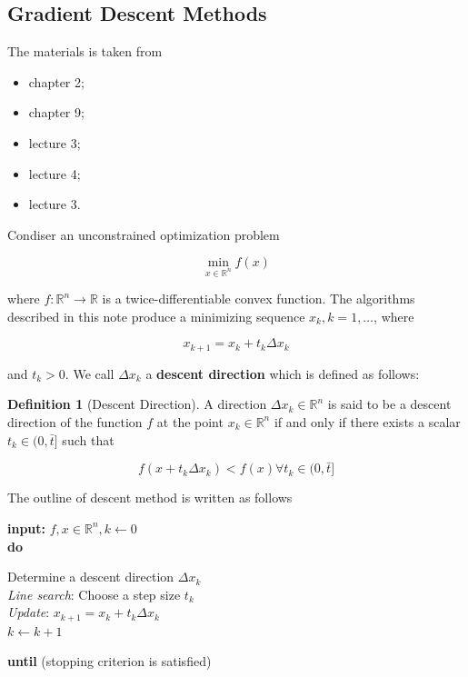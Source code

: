 \documentclass[12pt]{article} %
\theoremstyle{definition}
\newtheorem{definition}{Definition}
\newcommand{\Real}{\mathbb{R}}
\begin{document}
\subsection*{Gradient Descent Methods}

\noindent The materials is taken from

\begin{itemize}
	\item \cite{audet2017derivative} chapter 2;
	\item \cite{boyd2004convex} chapter 9;
	\item \cite{balakrishnan23convex} lecture 3;
	\item \cite{schmidt18machine} lecture 4;
	\item \cite{wang19convex} lecture 3.
\end{itemize}

Condiser an unconstrained optimization problem

$$
	\min_{x \in \Real^n} f(x)
$$

\noindent where $f: \Real^n \rightarrow \Real$ is a twice-differentiable convex  function. The algorithms described in this note produce a minimizing sequence $x_k, k = 1, \dots$, where

$$
	x_{k + 1} = x_k + t_k \Delta x_k
$$

\noindent and $t_k > 0$. We call $\Delta x_k$ a \textbf{descent direction} which is defined as follows:

\begin{definition}[Descent Direction]
	A direction $\Delta x_k \in \Real^n$ is said to be a descent direction of the function $f$ at the point $x_k \in \Real^n$ if and only if there exists a scalar $t_k \in (0, \bar{t}]$ such that

	$$
		f(x + t_k \Delta x_k) < f(x) \forall t_k \in (0, \bar{t}]
	$$
\end{definition}

The outline of descent method is written as follows

\begin{algorithm}
	\caption{General descent method}
  	\label{alg:descent method}
	\textbf{input: } $f, x \in \Real^n, k \leftarrow 0$ \\
	\textbf{do} \\
  	\begin{algorithmic}[1]
		\STATE Determine a descent direction $\Delta x_k$ \\
		\STATE \emph{Line search}: Choose a step size $t_k$ \\
		\STATE \emph{Update}: $x_{k + 1} = x_k + t_k \Delta x_k$ \\
		\STATE $k \leftarrow k + 1$
 	 \end{algorithmic}
	\textbf{until} (stopping criterion is satisfied) \\
\end{algorithm}
\end{document}
